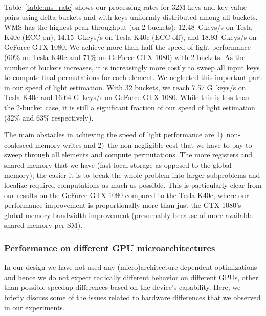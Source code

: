 Table~\ref{table:ms_rate} shows our processing rates for 32M keys and key-value pairs using delta-buckets and with keys uniformly distributed among all buckets.
WMS has the highest peak throughput (on 2 buckets): 12.48~Gkeys/s on Tesla K40c (ECC on), 14.15~Gkeys/s on Tesla K40c (ECC off), and 18.93~Gkeys/s on GeForce GTX 1080.
We achieve more than half the speed of light performance (60\% on Tesla K40c and 71\% on GeForce GTX 1080) with 2 buckets.
As the number of buckets increases, it is increasingly more costly to sweep all input keys to compute final permutations for each element.
We neglected this important part in our speed of light estimation.
With 32 buckets, we reach 7.57 G~keys/s on Tesla K40c and 16.64 G~keys/s on GeForce GTX 1080. While this is less than the 2-bucket case, it is still a significant fraction of our speed of light estimation (32\% and 63\% respectively).

The main obstacles in achieving the speed of light performance are 1)~non-coalesced memory writes and 2)~the non-negligible cost that we have to pay to sweep through all elements and compute permutations.
The more registers and shared memory that we have (fast local storage as opposed to the global memory), the easier it is to break the whole problem into larger subproblems and localize required computations as much as possible. This is particularly clear from our results on the GeForce GTX 1080 compared to the Tesla K40c, where our performance improvement is proportionally more than just the GTX 1080's global memory bandwidth improvement (presumably because of more available shared memory per SM).

\subsubsection{Performance on different GPU microarchitectures}\label{subsec:perf_architecture}
In our design we have not used any (micro)architecture-dependent optimizations and hence we do not expect radically different behavior on different GPUs, other than possible speedup differences based on the device's capability.
Here, we briefly discuss some of the issues related to hardware differences that we observed in our experiments.

